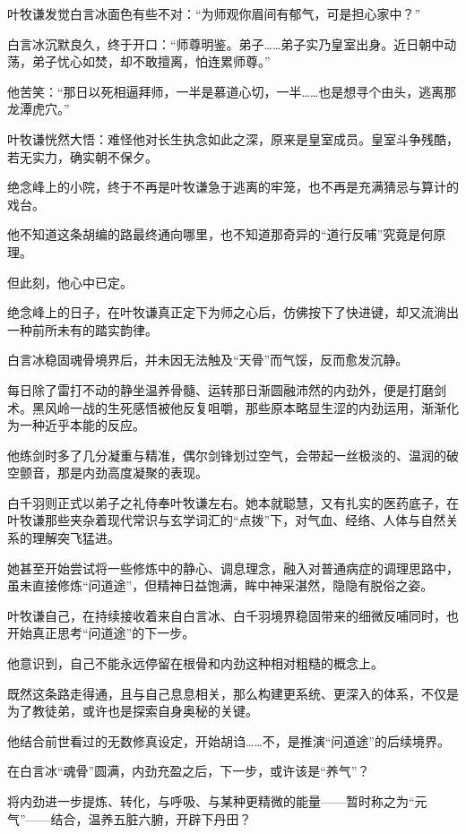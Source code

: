 叶牧谦发觉白言冰面色有些不对：“为师观你眉间有郁气，可是担心家中？”

白言冰沉默良久，终于开口：“师尊明鉴。弟子……弟子实乃皇室出身。近日朝中动荡，弟子忧心如焚，却不敢擅离，怕连累师尊。”

他苦笑：“那日以死相逼拜师，一半是慕道心切，一半……也是想寻个由头，逃离那龙潭虎穴。”

叶牧谦恍然大悟：难怪他对长生执念如此之深，原来是皇室成员。皇室斗争残酷，若无实力，确实朝不保夕。

绝念峰上的小院，终于不再是叶牧谦急于逃离的牢笼，也不再是充满猜忌与算计的戏台。

他不知道这条胡编的路最终通向哪里，也不知道那奇异的“道行反哺”究竟是何原理。

但此刻，他心中已定。

\vspace{2em}

绝念峰上的日子，在叶牧谦真正定下为师之心后，仿佛按下了快进键，却又流淌出一种前所未有的踏实韵律。

白言冰稳固魂骨境界后，并未因无法触及“天骨”而气馁，反而愈发沉静。

每日除了雷打不动的静坐温养骨髓、运转那日渐圆融沛然的内劲外，便是打磨剑术。黑风岭一战的生死感悟被他反复咀嚼，那些原本略显生涩的内劲运用，渐渐化为一种近乎本能的反应。

他练剑时多了几分凝重与精准，偶尔剑锋划过空气，会带起一丝极淡的、温润的破空颤音，那是内劲高度凝聚的表现。

白千羽则正式以弟子之礼侍奉叶牧谦左右。她本就聪慧，又有扎实的医药底子，在叶牧谦那些夹杂着现代常识与玄学词汇的“点拨”下，对气血、经络、人体与自然关系的理解突飞猛进。

她甚至开始尝试将一些修炼中的静心、调息理念，融入对普通病症的调理思路中，虽未直接修炼“问道途”，但精神日益饱满，眸中神采湛然，隐隐有脱俗之姿。

叶牧谦自己，在持续接收着来自白言冰、白千羽境界稳固带来的细微反哺同时，也开始真正思考“问道途”的下一步。

他意识到，自己不能永远停留在根骨和内劲这种相对粗糙的概念上。

既然这条路走得通，且与自己息息相关，那么构建更系统、更深入的体系，不仅是为了教徒弟，或许也是探索自身奥秘的关键。

他结合前世看过的无数修真设定，开始胡诌……不，是推演“问道途”的后续境界。

在白言冰“魂骨”圆满，内劲充盈之后，下一步，或许该是“养气”？

将内劲进一步提炼、转化，与呼吸、与某种更精微的能量——暂时称之为“元气”——结合，温养五脏六腑，开辟下丹田？

